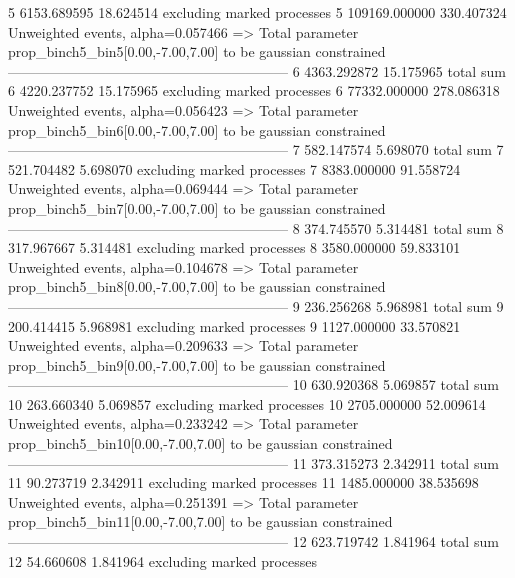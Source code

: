 5          6153.689595     18.624514       excluding marked processes    
5          109169.000000   330.407324      Unweighted events, alpha=0.057466
  => Total parameter prop_binch5_bin5[0.00,-7.00,7.00] to be gaussian constrained
------------------------------------------------------------
6          4363.292872     15.175965       total sum                     
6          4220.237752     15.175965       excluding marked processes    
6          77332.000000    278.086318      Unweighted events, alpha=0.056423
  => Total parameter prop_binch5_bin6[0.00,-7.00,7.00] to be gaussian constrained
------------------------------------------------------------
7          582.147574      5.698070        total sum                     
7          521.704482      5.698070        excluding marked processes    
7          8383.000000     91.558724       Unweighted events, alpha=0.069444
  => Total parameter prop_binch5_bin7[0.00,-7.00,7.00] to be gaussian constrained
------------------------------------------------------------
8          374.745570      5.314481        total sum                     
8          317.967667      5.314481        excluding marked processes    
8          3580.000000     59.833101       Unweighted events, alpha=0.104678
  => Total parameter prop_binch5_bin8[0.00,-7.00,7.00] to be gaussian constrained
------------------------------------------------------------
9          236.256268      5.968981        total sum                     
9          200.414415      5.968981        excluding marked processes    
9          1127.000000     33.570821       Unweighted events, alpha=0.209633
  => Total parameter prop_binch5_bin9[0.00,-7.00,7.00] to be gaussian constrained
------------------------------------------------------------
10         630.920368      5.069857        total sum                     
10         263.660340      5.069857        excluding marked processes    
10         2705.000000     52.009614       Unweighted events, alpha=0.233242
  => Total parameter prop_binch5_bin10[0.00,-7.00,7.00] to be gaussian constrained
------------------------------------------------------------
11         373.315273      2.342911        total sum                     
11         90.273719       2.342911        excluding marked processes    
11         1485.000000     38.535698       Unweighted events, alpha=0.251391
  => Total parameter prop_binch5_bin11[0.00,-7.00,7.00] to be gaussian constrained
------------------------------------------------------------
12         623.719742      1.841964        total sum                     
12         54.660608       1.841964        excluding marked processes    
